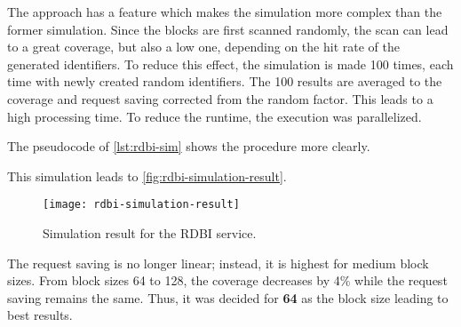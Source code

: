 The approach has a feature which makes the simulation more complex than the former simulation. Since the blocks are first scanned randomly, the scan can lead to a great coverage, but also a low one, depending on the hit rate of the generated identifiers. To reduce this effect, the simulation is made 100 times, each time with newly created random identifiers. The 100 results are averaged to the coverage and request saving corrected from the random factor. This leads to a high processing time. To reduce the runtime, the execution was parallelized.

The pseudocode of \autoref{lst:rdbi-sim} shows the procedure more clearly.


This simulation leads to \autoref{fig:rdbi-simulation-result}.

\begin{figure}[htb]
    \centering
    \texttt{[image: rdbi-simulation-result]}
    \caption{Simulation result for the RDBI service.}
    \label{fig:rdbi-simulation-result}
\end{figure}

The request saving is no longer linear; instead, it is highest for medium block sizes. From block sizes 64 to 128, the coverage decreases by 4\% while the request saving remains the same. Thus, it was decided for \textbf{64} as the block size leading to best results.


